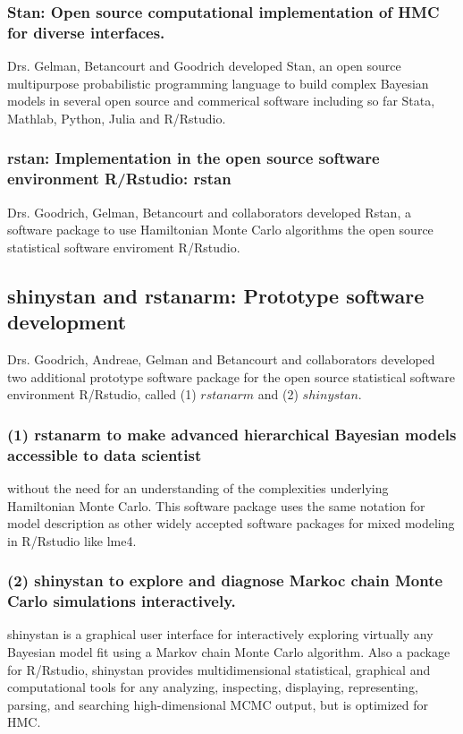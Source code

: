 \documentclass[11pt,notitlepage]{article}
\begin{document}
\subsubsection*{Stan: Open source computational implementation of HMC for diverse interfaces.} Drs. Gelman, Betancourt and Goodrich developed Stan, an open source multipurpose probabilistic programming language to build complex Bayesian models in several open source and commerical software including so far Stata, Mathlab, Python, Julia and R/Rstudio. 
 
\subsubsection*{rstan: Implementation in the open source software environment R/Rstudio: rstan} Drs. Goodrich, Gelman, Betancourt and collaborators developed Rstan, a software package to use Hamiltonian Monte Carlo algorithms the open source statistical software enviroment R/Rstudio.

\subsection*{shinystan and rstanarm: Prototype software development} Drs. Goodrich, Andreae, Gelman and Betancourt and collaborators developed two additional prototype software package for the open source statistical software environment R/Rstudio, called (1) $rstanarm$ and (2) $shinystan$.

\subsubsection*{(1) rstanarm to make advanced hierarchical Bayesian models accessible to data scientist} without the need for an understanding of the complexities underlying Hamiltonian Monte Carlo. This software package uses the same notation for model description as other widely accepted software packages for mixed modeling in R/Rstudio like lme4. 

\subsubsection*{(2) shinystan to explore and diagnose Markoc chain Monte Carlo simulations interactively.}  shinystan is a graphical user interface for interactively exploring virtually any Bayesian model fit using a Markov chain Monte Carlo algorithm. Also a package for R/Rstudio, shinystan  provides multidimensional statistical, graphical and computational tools for any analyzing, inspecting, displaying, representing, parsing, and searching high-dimensional MCMC output, but is optimized for HMC. 
\end{document}
